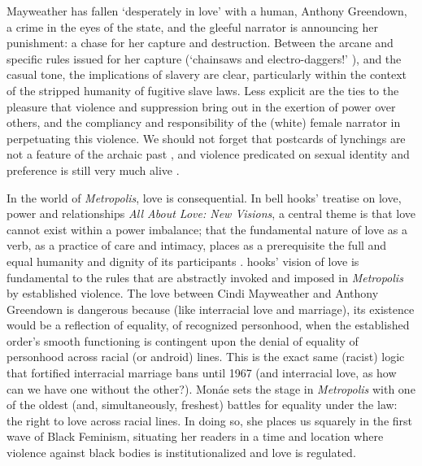 \documentclass[a4paper, 11pt]{article} %
\begin{document}
Mayweather has fallen `desperately in love' with a human, Anthony Greendown, a crime in the eyes of the state, and the gleeful narrator is announcing her punishment: a chase for her capture and destruction.
Between the arcane and specific rules issued for her capture (`chainsaws and electro-daggers!' ), and the casual tone, the implications of slavery are clear, particularly within the context of the stripped humanity of fugitive slave laws.
Less explicit are the ties to the pleasure that violence and suppression bring out in the exertion of power over others, and the compliancy and responsibility of the (white) female narrator in perpetuating this violence.
We should not forget that postcards of lynchings are not a feature of the archaic past , and violence predicated on sexual identity and preference is still very much alive .

In the world of \emph{Metropolis}, love is consequential.
In bell hooks' treatise on love, power and relationships \emph{All About Love: New Visions}, a central theme is that love cannot exist within a power imbalance; that the fundamental nature of love as a verb, as a practice of care and intimacy, places as a prerequisite the full and equal humanity and dignity of its participants . 
hooks' vision of love is fundamental to the rules that are abstractly invoked and imposed in \emph{Metropolis} by established violence. 
The love between Cindi Mayweather  and Anthony Greendown is dangerous because (like interracial love and marriage), its existence would be a reflection of equality, of recognized personhood, when the established order's smooth functioning is contingent upon the denial of equality of personhood across racial (or android) lines. 
This is the exact same (racist) logic that fortified interracial marriage bans until 1967  (and interracial love, as how can we have one without the other?).
Mon\'ae sets the stage in \emph{Metropolis} with one of the oldest (and, simultaneously, freshest) battles for equality under the law: the right to love across racial lines.
In doing so, she places us squarely in the first wave of Black Feminism, situating her readers in a time and location where violence against black bodies is institutionalized and love is regulated.
\end{document}
